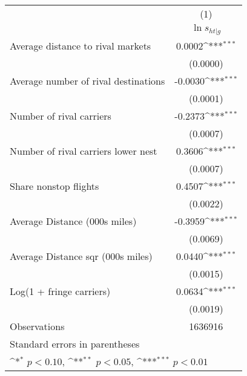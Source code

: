 {
\def\sym#1{\ifmmode^{#1}\else\(^{#1}\)\fi}
\begin{tabular}{l*{1}{c}}
\toprule
                    &\multicolumn{1}{c}{(1)}\\
                    &\multicolumn{1}{c}{$\ln s_{ht|g}$}\\
\midrule
Average distance to rival markets&      0.0002\sym{***}\\
                    &    (0.0000)         \\
\addlinespace
Average number of rival destinations&     -0.0030\sym{***}\\
                    &    (0.0001)         \\
\addlinespace
Number of rival carriers&     -0.2373\sym{***}\\
                    &    (0.0007)         \\
\addlinespace
Number of rival carriers lower nest&      0.3606\sym{***}\\
                    &    (0.0007)         \\
\addlinespace
Share nonstop flights &      0.4507\sym{***}\\
                    &    (0.0022)         \\
\addlinespace
Average Distance (000s miles)&     -0.3959\sym{***}\\
                    &    (0.0069)         \\
\addlinespace
Average Distance sqr (000s miles)&      0.0440\sym{***}\\
                    &    (0.0015)         \\
\addlinespace
Log(1 + fringe carriers)&      0.0634\sym{***}\\
                    &    (0.0019)         \\
\midrule
Observations        &     1636916         \\
\bottomrule
\multicolumn{2}{l}{\footnotesize Standard errors in parentheses}\\
\multicolumn{2}{l}{\footnotesize \sym{*} \(p<0.10\), \sym{**} \(p<0.05\), \sym{***} \(p<0.01\)}\\
\end{tabular}
}

